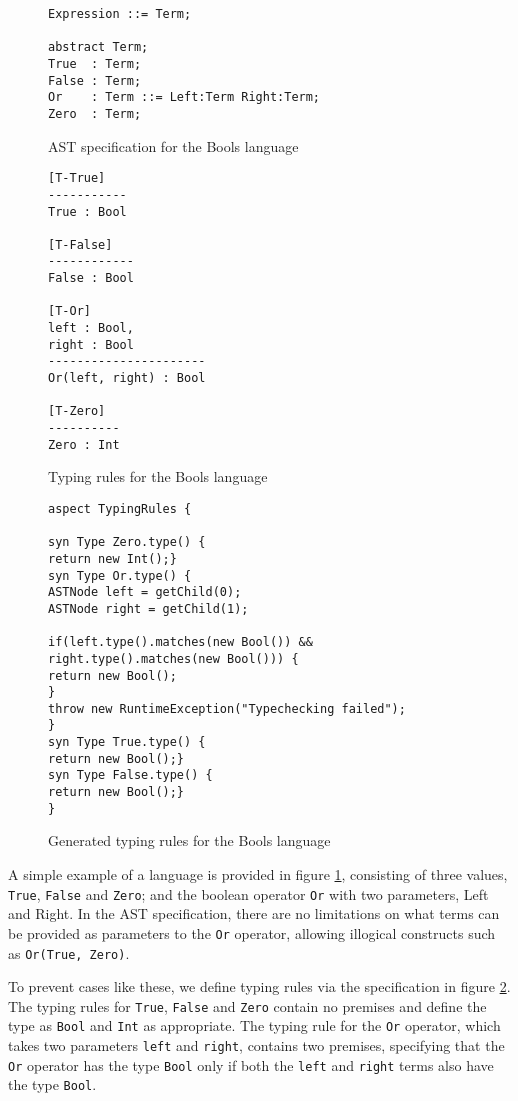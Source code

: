 \documentclass[nofilelist]{cslthse-msc}
\begin{document}
\begin{figure}[h]
\begin{lstlisting}[]
Expression ::= Term;

abstract Term;
True  : Term;
False : Term;
Or    : Term ::= Left:Term Right:Term;
Zero  : Term;
\end{lstlisting}
  \caption{AST specification for the Bools language}
  \label{boolsast}
\end{figure}
\begin{figure}[h]
\begin{lstlisting}[]
[T-True]
-----------
True : Bool

[T-False]
------------
False : Bool

[T-Or]
left : Bool,
right : Bool
----------------------
Or(left, right) : Bool

[T-Zero]
----------
Zero : Int
\end{lstlisting}
  \caption{Typing rules for the Bools language}
  \label{boolstr}
\end{figure}

\begin{figure}[h]
\begin{lstlisting}[]
aspect TypingRules {

syn Type Zero.type() {
return new Int();}
syn Type Or.type() {
ASTNode left = getChild(0);
ASTNode right = getChild(1);

if(left.type().matches(new Bool()) && right.type().matches(new Bool())) {
return new Bool();
}
throw new RuntimeException("Typechecking failed");
}
syn Type True.type() {
return new Bool();}
syn Type False.type() {
return new Bool();}
}
\end{lstlisting}
  \caption{Generated typing rules for the Bools language}
  \label{boolstrgen}
\end{figure}
A simple example of a language is provided in figure \ref{boolsast}, consisting of three values, \verb|True|, \verb|False| and \verb|Zero|; and the boolean operator \verb|Or| with two parameters, Left and Right.
In the AST specification, there are no limitations on what terms can be provided as parameters to the \verb|Or| operator, allowing illogical constructs such as \verb|Or(True, Zero)|.

To prevent cases like these, we define typing rules via the specification in figure \ref{boolstr}.
The typing rules for \verb|True|, \verb|False| and \verb|Zero| contain no premises and define the type as \verb|Bool| and \verb|Int| as appropriate.
The typing rule for the \verb|Or| operator, which takes two parameters \verb|left| and \verb|right|, contains two premises, specifying that the \verb|Or| operator has the type \verb|Bool| only if both the \verb|left| and \verb|right| terms also have the type \verb|Bool|.
\end{document}
